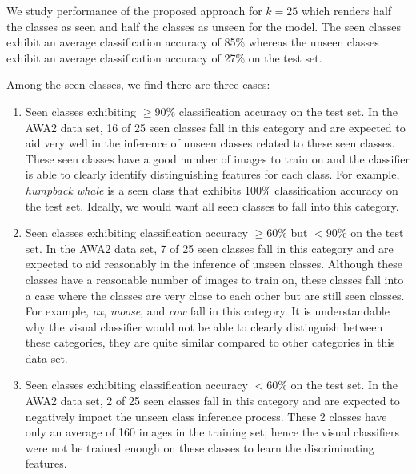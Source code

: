 We study performance of the proposed approach for $k = 25$ which renders half the classes as seen and half the classes as unseen for the model. The seen classes exhibit an average classification accuracy of 85\% whereas the unseen classes exhibit an average classification accuracy of 27\% on the test set. 

Among the seen classes, we find there are three cases:

\begin{enumerate}[label=Seen Case: \arabic*]
    \item Seen classes exhibiting $\geq 90\%$ classification accuracy on the test set. In the AWA2 data set, 16 of 25 seen classes fall in this category and are expected to aid very well in the inference of unseen classes related to these seen classes. These seen classes have a good number of images to train on and the classifier is able to clearly identify distinguishing features for each class. For example, \textit{humpback whale} is a seen class that exhibits 100\% classification accuracy on the test set. Ideally, we would want all seen classes to fall into this category.
    
    \item Seen classes exhibiting classification accuracy $\geq 60\%$ but $< 90\%$ on the test set. In the AWA2 data set, 7 of 25 seen classes fall in this category and are expected to aid reasonably in the inference of unseen classes. Although these classes have a reasonable number of images to train on, these classes fall into a case where the classes are very close to each other but are still seen classes. For example, \textit{ox}, \textit{moose}, and \textit{cow} fall in this category. It is understandable why the visual classifier would not be able to clearly distinguish between these categories, they are quite similar compared to other categories in this data set.  
    
    \item Seen classes exhibiting classification accuracy $ < 60\%$ on the test set. In the AWA2 data set, 2 of 25 seen classes fall in this category and are expected to negatively impact the unseen class inference process. These 2 classes have only an average of 160 images in the training set, hence the visual classifiers were not be trained enough on these classes to learn the discriminating features.
\end{enumerate}

\par
\medskip

